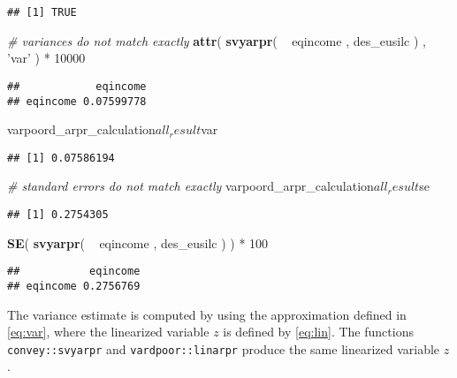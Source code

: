\documentclass[]{book}
\newenvironment{Shaded}{\begin{snugshade}}{\end{snugshade}}
\newcommand{\KeywordTok}[1]{\textcolor[rgb]{0.13,0.29,0.53}{\textbf{{#1}}}}
\newcommand{\DecValTok}[1]{\textcolor[rgb]{0.00,0.00,0.81}{{#1}}}
\newcommand{\StringTok}[1]{\textcolor[rgb]{0.31,0.60,0.02}{{#1}}}
\newcommand{\CommentTok}[1]{\textcolor[rgb]{0.56,0.35,0.01}{\textit{{#1}}}}
\newcommand{\NormalTok}[1]{{#1}}
\theoremstyle{definition}
\theoremstyle{definition}
\theoremstyle{remark}
\begin{document}
\begin{verbatim}
## [1] TRUE
\end{verbatim}

\begin{Shaded}
\begin{Highlighting}[]
\CommentTok{# variances do not match exactly}
\KeywordTok{attr}\NormalTok{( }\KeywordTok{svyarpr}\NormalTok{( ~}\StringTok{ }\NormalTok{eqincome , des_eusilc ) , }\StringTok{'var'} \NormalTok{) *}\StringTok{ }\DecValTok{10000}
\end{Highlighting}
\end{Shaded}

\begin{verbatim}
##            eqincome
## eqincome 0.07599778
\end{verbatim}

\begin{Shaded}
\begin{Highlighting}[]
\NormalTok{varpoord_arpr_calculation$all_result$var}
\end{Highlighting}
\end{Shaded}

\begin{verbatim}
## [1] 0.07586194
\end{verbatim}

\begin{Shaded}
\begin{Highlighting}[]
\CommentTok{# standard errors do not match exactly}
\NormalTok{varpoord_arpr_calculation$all_result$se}
\end{Highlighting}
\end{Shaded}

\begin{verbatim}
## [1] 0.2754305
\end{verbatim}

\begin{Shaded}
\begin{Highlighting}[]
\KeywordTok{SE}\NormalTok{( }\KeywordTok{svyarpr}\NormalTok{( ~}\StringTok{ }\NormalTok{eqincome , des_eusilc ) ) *}\StringTok{ }\DecValTok{100}
\end{Highlighting}
\end{Shaded}

\begin{verbatim}
##           eqincome
## eqincome 0.2756769
\end{verbatim}

The variance estimate is computed by using the approximation defined in
\eqref{eq:var}, where the linearized variable \(z\) is defined by
\eqref{eq:lin}. The functions \texttt{convey::svyarpr} and
\texttt{vardpoor::linarpr} produce the same linearized variable \(z\).
\end{document}
